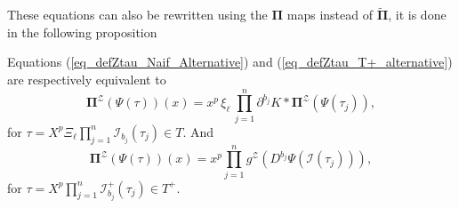 \documentclass[11pt]{preprint}
\newcommand{\mcI}{\mathcal{I}}
\newcommand{\mcZ}{\mathcal{Z}}
\def\PPi{\boldsymbol{\Pi}}
\def\eqref#1{(\ref{#1})}
\begin{document}
These equations can also be rewritten using the $\PPi$ maps instead of $\widetilde{\PPi}$, it is done in the following proposition
\begin{proposition}\label{prop_alternativedef_Ztaunaif}
	Equations \eqref{eq_defZtau_Naif_Alternative} and \eqref{eq_defZtau_T+_alternative} are respectively equivalent to
\begin{equation} \label{eq_defZtau_Naif_Alternative_PPi}
	{ \PPi}^\mcZ\left(\Psi(\tau)\right)(x) = x^p \, \xi_\ell  \,  \prod_{j=1}^{n} \partial^{b_j}K * {\PPi}^\mcZ\left(\Psi(\tau_j)\right),  
\end{equation}
for $\tau = X^p\Xi_\ell\prod_{j=1}^n\mcI_{b_j}(\tau_j) \in T$. And 
\begin{equation} \label{eq_defZtau_T+_alternative_PPi}
	{ \PPi}^\mcZ\left(\Psi(\tau)\right)(x) = x^p \prod_{j=1}^{n} { g}^\mcZ\left(D^{b_j}\Psi(\mcI(\tau_j))\right),
\end{equation}
for $\tau = X^p\prod_{j=1}^n\mcI^+_{b_j}(\tau_j) \in T^+$.
\end{proposition}
\end{document}
